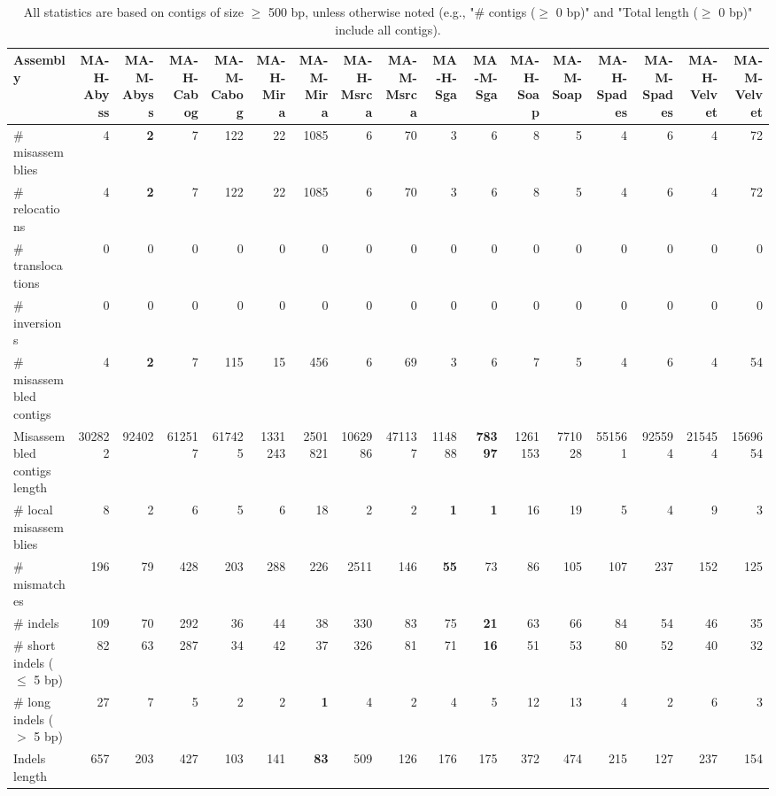 \documentclass[12pt,a4paper]{article}
\begin{document}
\begin{table}[ht]
\begin{center}
\caption{All statistics are based on contigs of size $\geq$ 500 bp, unless otherwise noted (e.g., "\# contigs ($\geq$ 0 bp)" and "Total length ($\geq$ 0 bp)" include all contigs).}
\begin{tabular}{|l*{16}{|r}|}
\hline
Assembly & MA-H-Abyss & MA-M-Abyss & MA-H-Cabog & MA-M-Cabog & MA-H-Mira & MA-M-Mira & MA-H-Msrca & MA-M-Msrca & MA-H-Sga & MA-M-Sga & MA-H-Soap & MA-M-Soap & MA-H-Spades & MA-M-Spades & MA-H-Velvet & MA-M-Velvet \\ \hline
\# misassemblies & 4 & {\bf 2} & 7 & 122 & 22 & 1085 & 6 & 70 & 3 & 6 & 8 & 5 & 4 & 6 & 4 & 72 \\ \hline
\hspace{5mm}\# relocations & 4 & {\bf 2} & 7 & 122 & 22 & 1085 & 6 & 70 & 3 & 6 & 8 & 5 & 4 & 6 & 4 & 72 \\ \hline
\hspace{5mm}\# translocations & 0 & 0 & 0 & 0 & 0 & 0 & 0 & 0 & 0 & 0 & 0 & 0 & 0 & 0 & 0 & 0 \\ \hline
\hspace{5mm}\# inversions & 0 & 0 & 0 & 0 & 0 & 0 & 0 & 0 & 0 & 0 & 0 & 0 & 0 & 0 & 0 & 0 \\ \hline
\# misassembled contigs & 4 & {\bf 2} & 7 & 115 & 15 & 456 & 6 & 69 & 3 & 6 & 7 & 5 & 4 & 6 & 4 & 54 \\ \hline
Misassembled contigs length & 302822 & 92402 & 612517 & 617425 & 1331243 & 2501821 & 1062986 & 471137 & 114888 & {\bf 78397} & 1261153 & 771028 & 551561 & 925594 & 215454 & 1569654 \\ \hline
\# local misassemblies & 8 & 2 & 6 & 5 & 6 & 18 & 2 & 2 & {\bf 1} & {\bf 1} & 16 & 19 & 5 & 4 & 9 & 3 \\ \hline
\# mismatches & 196 & 79 & 428 & 203 & 288 & 226 & 2511 & 146 & {\bf 55} & 73 & 86 & 105 & 107 & 237 & 152 & 125 \\ \hline
\# indels & 109 & 70 & 292 & 36 & 44 & 38 & 330 & 83 & 75 & {\bf 21} & 63 & 66 & 84 & 54 & 46 & 35 \\ \hline
\hspace{5mm}\# short indels ($\leq$ 5 bp) & 82 & 63 & 287 & 34 & 42 & 37 & 326 & 81 & 71 & {\bf 16} & 51 & 53 & 80 & 52 & 40 & 32 \\ \hline
\hspace{5mm}\# long indels ($>$ 5 bp) & 27 & 7 & 5 & 2 & 2 & {\bf 1} & 4 & 2 & 4 & 5 & 12 & 13 & 4 & 2 & 6 & 3 \\ \hline
Indels length & 657 & 203 & 427 & 103 & 141 & {\bf 83} & 509 & 126 & 176 & 175 & 372 & 474 & 215 & 127 & 237 & 154 \\ \hline
\end{tabular}
\end{center}
\end{table}
\end{document}
